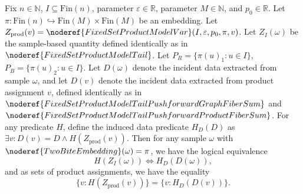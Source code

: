 \begin{helper}
Fix $n\in\mathbb N$, $I\subseteq\mathrm{Fin}(n)$, parameter $\varepsilon\in\mathbb R$, parameter $M\in\mathbb N$, and $p_0\in\mathbb R$.
Let $\pi:\mathrm{Fin}(n)\hookrightarrow\mathrm{Fin}(M)\times\mathrm{Fin}(M)$ be an embedding.
Let $Z_{\mathrm{prod}}(v)=\noderef{FixedSetProductModelVar}(I,\varepsilon,p_0,\pi,v)$.
Let $Z_I(\omega)$ be the sample-based quantity defined identically as in \(\noderef{FixedSetProductModelTail}\).
Let $P_R=\{\pi(u)_1:u\in I\}$, $P_B=\{\pi(u)_2:u\in I\}$.
Let $D(\omega)$ denote the incident data extracted from sample $\omega$, and let $D(v)$ denote the incident data extracted from product assignment $v$, defined identically as in \(\noderef{FixedSetProductModelTailPushforwardGraphFiberSum}\) and \(\noderef{FixedSetProductModelTailPushforwardProductFiberSum}\).
For any predicate $H$, define the induced data predicate $H_D(D)$ as $\exists v: D(v)=D \land H(Z_{\mathrm{prod}}(v))$.
Then for any sample $\omega$ with \(\noderef{TwoBiteEmbedding}(\omega)=\pi\), we have the logical equivalence
\[
H(Z_I(\omega)) \iff H_D(D(\omega)),
\]
and as sets of product assignments, we have the equality
\[
\{v: H(Z_{\mathrm{prod}}(v))\} = \{v: H_D(D(v))\}.
\]
\end{helper}
